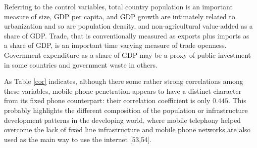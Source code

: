 \documentclass[10pt,letterpaper]{article}
\begin{document}
Referring to the control variables, total country population is an
important measure of size, GDP per capita, and GDP growth are intimately
related to urbanization and so are population density, and
non-agricultural value-added as a share of GDP. Trade, that is
conventionally measured as exports plus imports as a share of GDP, is an
important time varying measure of trade openness. Government expenditure
as a share of GDP may be a proxy of public investment in some countries
and government waste in others.

As Table \ref{cor} indicates, although there some rather strong
correlations among these variables, mobile phone penetration appears to
have a distinct character from its fixed phone counterpart: their
correlation coefficient is only \(0.445\). This probably highlights the
different composition of the population or infrastructure development
patterns in the developing world, where mobile telephony helped overcome
the lack of fixed line infrastructure and mobile phone networks are also
used as the main way to use the internet {[}53,54{]}.
\end{document}
